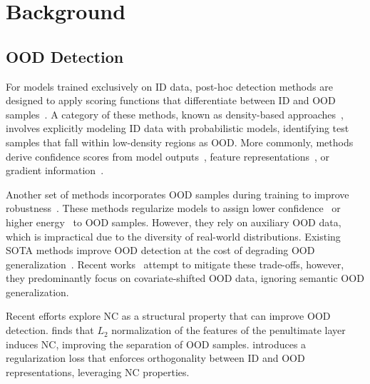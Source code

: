 \section{Background}
\label{sec:background}



\subsection{OOD Detection}

For models trained exclusively on ID data, post-hoc detection methods are designed to apply scoring functions that differentiate between ID and OOD samples~\cite{salehi2022a}. A category of these methods, known as density-based approaches~\cite{lee2018simple, zisselman2020deep, choi2018waic, jiang2023diverse}, involves explicitly modeling ID data with probabilistic models, identifying test samples that fall within low-density regions as OOD. More commonly, methods derive confidence scores from model outputs~\cite{hendrycks2016baseline, liang2017enhancing, liu2020energy}, feature representations~\cite{sun2021react, zhu2022boosting, sun2022out}, or gradient information~\cite{huang2021importance, wu2024low, lee2023probing, igoe2022useful}. 


Another set of methods incorporates OOD samples during training to improve robustness~\cite{wu2024pursuing, bai2023feed, katz2022training, ming2022poem}. These methods regularize models to assign lower confidence~\cite{hendrycks2018deep} or higher energy~\cite{liu2020energy} to OOD samples.
However, they rely on auxiliary OOD data, which is impractical due to the diversity of real-world distributions. %
Existing SOTA methods improve OOD detection at the cost of degrading OOD generalization~\cite{zhang2024best}.
Recent works~\cite{zhang2024best, wang2024bridging, bai2023feed} attempt to mitigate these trade-offs, however, they predominantly focus on covariate-shifted OOD data, ignoring semantic OOD generalization.


Recent efforts explore NC as a structural property that can improve OOD detection. \citet{haas2023linking} finds that $L_2$ normalization of the features of the penultimate layer induces NC, improving the separation of OOD samples. \citet{wu2024pursuing} introduces a regularization loss that enforces orthogonality between ID and OOD representations, leveraging NC properties.

